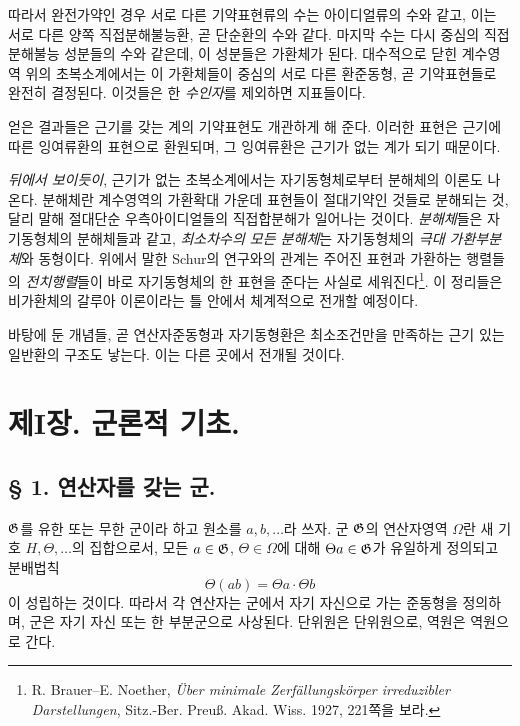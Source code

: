 따라서 완전가약인 경우 서로 다른 기약표현류의 수는 아이디얼류의 수와 같고, 이는 서로 다른 양쪽 직접분해불능환, 곧 단순환의 수와 같다. 마지막 수는 다시 중심의 직접분해불능 성분들의 수와 같은데, 이 성분들은 가환체가 된다. 대수적으로 닫힌 계수영역 위의 초복소계에서는 이 가환체들이 중심의 서로 다른 환준동형, 곧 기약표현들로 완전히 결정된다. 이것들은 한 \emph{수인자}를 제외하면 지표들이다.

얻은 결과들은 근기를 갖는 계의 기약표현도 개관하게 해 준다. 이러한 표현은 근기에 따른 잉여류환의 표현으로 환원되며, 그 잉여류환은 근기가 없는 계가 되기 때문이다.

\emph{뒤에서 보이듯이}, 근기가 없는 초복소계에서는 자기동형체로부터 \glqq{}분해체\grqq{}의 이론도 나온다. 분해체란 계수영역의 가환확대 가운데 표현들이 절대기약인 것들로 분해되는 것, 달리 말해 절대단순 우측아이디얼들의 직접합분해가 일어나는 것이다. \emph{분해체}들은 자기동형체의 분해체들과 같고, \emph{최소차수의 모든 분해체}는 자기동형체의 \emph{극대 가환부분체}와 동형이다. 위에서 말한 Schur의 연구와의 관계는 주어진 표현과 가환하는 행렬들의 \emph{전치행렬}들이 바로 자기동형체의 한 표현을 준다는 사실로 세워진다\footnote{R. Brauer--E. Noether, \emph{Über minimale Zerfällungskörper irreduzibler Darstellungen}, Sitz.-Ber. Preuß. Akad. Wiss. 1927, 221쪽을 보라.}. 이 정리들은 비가환체의 갈루아 이론이라는 틀 안에서 체계적으로 전개할 예정이다.

바탕에 둔 개념들, 곧 연산자준동형과 자기동형환은 최소조건만을 만족하는 근기 있는 일반환의 구조도 낳는다. 이는 다른 곳에서 전개될 것이다.

\section*{제I장. 군론적 기초.}

\subsection*{§ 1. 연산자를 갖는 군\footnotemark.}

\(\mathfrak G\)를 유한 또는 무한 군이라 하고 원소를 \(a,b,\ldots\)라 쓰자. 군 \(\mathfrak G\)의 연산자영역 \(\Omega\)란 새 기호 \(H,\Theta,\ldots\)의 집합으로서, 모든 \(a\in\mathfrak G\), \(\Theta\in\Omega\)에 대해 \(\Theta a\in\mathfrak G\)가 유일하게 정의되고 분배법칙
\[
        \Theta(ab)=\Theta a\cdot\Theta b
\]
이 성립하는 것이다. 따라서 각 연산자는 군에서 자기 자신으로 가는 준동형을 정의하며, 군은 자기 자신 또는 한 부분군으로 사상된다. 단위원은 단위원으로, 역원은 역원으로 간다.

